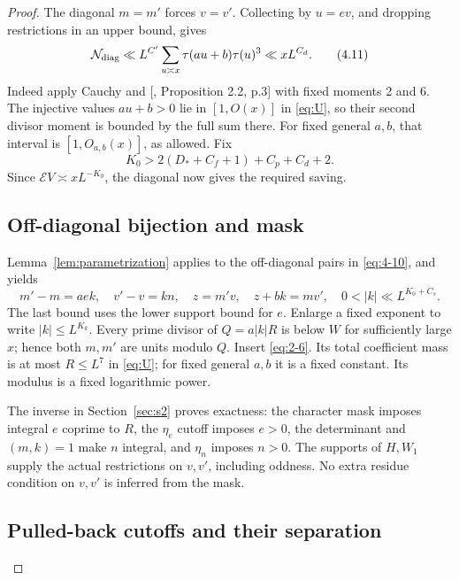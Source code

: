 \documentclass[11pt]{article}
\theoremstyle{definition}
\theoremstyle{definition}
\begin{document}
\begin{proof}
The diagonal \(m=m'\) forces \(v=v'\). Collecting by \(u=ev\), and dropping restrictions in an upper bound, gives
\begin{equation}
\mathcal N_{\rm diag}\ll
 L^{C'}\sum_{u\asymp x}\tau(au+b)\tau(u)^3
 \ll xL^{C_d}.                                         \tag{4.11}\label{eq:4-11}
\end{equation}
Indeed apply Cauchy and [, Proposition 2.2, p.3] with fixed moments 2 and 6. The injective values \(au+b>0\) lie in \([1,O(x)]\) in \eqref{eq:U}, so their second divisor moment is bounded by the full sum there. For fixed general \(a,b\), that interval is \([1,O_{a,b}(x)]\), as allowed. Fix
\begin{equation}
K_0>2(D_*+C_f+1)+C_p+C_d+2.                            \tag{4.12}\label{eq:4-12}
\end{equation}
Since \(\mathcal E V\asymp xL^{-K_0}\), the diagonal now gives the required saving.

\subsection{Off-diagonal bijection and mask}\label{sec:s4.4}

Lemma~\ref{lem:parametrization} applies to the off-diagonal pairs in \eqref{eq:4-10}, and yields
\begin{equation}
m'-m=aek,\quad v'-v=kn,\quad z=m'v,\quad z+bk=mv',
 \quad0<|k|\ll L^{K_0+C_s}.                             \tag{4.13}\label{eq:4-13}
\end{equation}
The last bound uses the lower support bound for \(e\). Enlarge a fixed exponent to write \(|k|\le L^{K_k}\). Every prime divisor of \(Q=a|k|R\) is below \(W\) for sufficiently large \(x\); hence both \(m,m'\) are units modulo \(Q\). Insert \eqref{eq:2-6}. Its total coefficient mass is at most \(R\le L^7\) in \eqref{eq:U}; for fixed general \(a,b\) it is a fixed constant. Its modulus is a fixed logarithmic power.

The inverse in Section~\ref{sec:s2} proves exactness: the character mask imposes integral \(e\) coprime to \(R\), the \(\eta_e\) cutoff imposes \(e>0\), the determinant and \((m,k)=1\) make \(n\) integral, and \(\eta_n\) imposes \(n>0\). The supports of \(H,W_1\) supply the actual restrictions on \(v,v'\), including oddness. No extra residue condition on \(v,v'\) is inferred from the mask.

\subsection{Pulled-back cutoffs and their separation}\label{sec:s4.5}


\end{proof}
\end{document}
